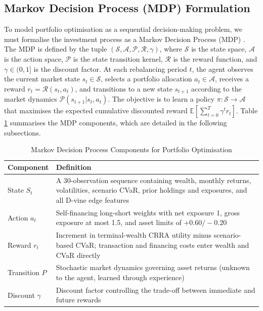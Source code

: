 \subsection{Markov Decision Process (MDP) Formulation}
\label{subsec:3_markov_decision_process}

To model portfolio optimisation as a sequential decision-making problem, we must formalise the investment process as a Markov Decision Process (MDP) \cite{sutton_reinforcement_2018}. The MDP is defined by the tuple $(\mathcal{S}, \mathcal{A}, \mathcal{P}, \mathcal{R}, \gamma)$, where $\mathcal{S}$ is the state space, $\mathcal{A}$ is the action space, $\mathcal{P}$ is the state transition kernel, $\mathcal{R}$ is the reward function, and $\gamma \in (0,1]$ is the discount factor. At each rebalancing period $t$, the agent observes the current market state $s_t \in \mathcal{S}$, selects a portfolio allocation $a_t \in \mathcal{A}$, receives a reward $r_t = \mathcal{R}(s_t, a_t)$, and transitions to a new state $s_{t+1}$ according to the market dynamics $\mathcal{P}(s_{t+1} | s_t, a_t)$. The objective is to learn a policy $\pi: \mathcal{S} \to \mathcal{A}$ that maximises the expected cumulative discounted reward $\mathbb{E}[\sum_{t=0}^{T} \gamma^t r_t]$. Table \ref{tab:mdp_components} summarises the MDP components, which are detailed in the following subsections.

\begin{table}[H]
\centering
\caption{Markov Decision Process Components for Portfolio Optimisation}
\label{tab:mdp_components}
\begin{tabular}{p{2.5cm} p{10cm}}
\toprule
\textbf{Component} & \textbf{Definition} \\
\midrule
State $S_t$ & A 30-observation sequence containing wealth, monthly returns, volatilities, scenario CVaR, prior holdings and exposures, and all D-vine edge features \\
Action $a_t$ & Self-financing long-short weights with net exposure 1, gross exposure at most 1.5, and asset limits of $+0.60/-0.20$ \\
Reward $r_t$ & Increment in terminal-wealth CRRA utility minus scenario-based CVaR; transaction and financing costs enter wealth and CVaR directly \\
Transition $P$ & Stochastic market dynamics governing asset returns (unknown to the agent, learned through experience) \\
Discount $\gamma$ & Discount factor controlling the trade-off between immediate and future rewards \\
\bottomrule
\end{tabular}
\end{table}

